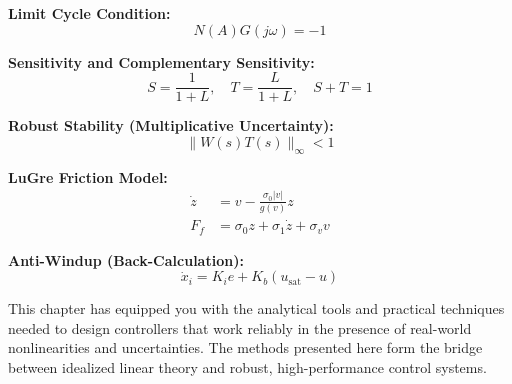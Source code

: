\textbf{Limit Cycle Condition:}
\begin{equation}
N(A)G(j\omega) = -1
\end{equation}

\textbf{Sensitivity and Complementary Sensitivity:}
\begin{equation}
S = \frac{1}{1+L}, \quad T = \frac{L}{1+L}, \quad S + T = 1
\end{equation}

\textbf{Robust Stability (Multiplicative Uncertainty):}
\begin{equation}
\|W(s)T(s)\|_\infty < 1
\end{equation}

\textbf{LuGre Friction Model:}
\begin{align}
\dot{z} &= v - \frac{\sigma_0|v|}{g(v)}z \\
F_f &= \sigma_0 z + \sigma_1\dot{z} + \sigma_v v
\end{align}

\textbf{Anti-Windup (Back-Calculation):}
\begin{equation}
\dot{x}_i = K_i e + K_b(u_{\text{sat}} - u)
\end{equation}

This chapter has equipped you with the analytical tools and practical techniques needed to design controllers that work reliably in the presence of real-world nonlinearities and uncertainties. The methods presented here form the bridge between idealized linear theory and robust, high-performance control systems.

